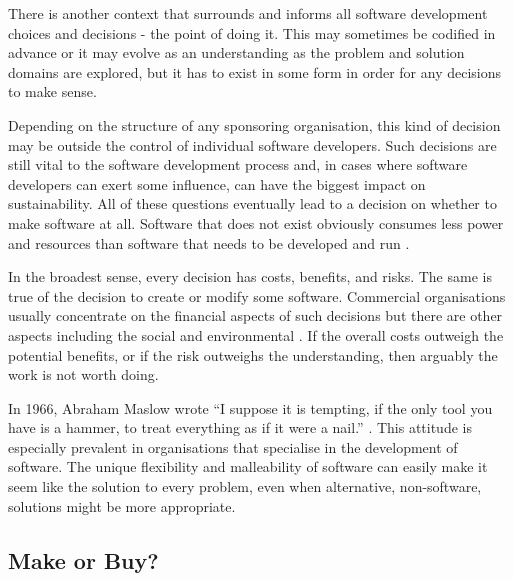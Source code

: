 There is another context that surrounds and informs all software development choices and decisions - the point of doing it. This may sometimes be codified in advance or it may evolve as an understanding as the problem and solution domains are explored, but it has to exist in some form in order for any decisions to make sense.

Depending on the structure of any sponsoring organisation, this kind of decision may be outside the control of individual software developers. Such decisions are still vital to the software development process and, in cases where software developers can exert some influence, can have the biggest impact on sustainability. All of these questions eventually lead to a decision on whether to make software at all. Software that does not exist obviously consumes less power and resources than software that needs to be developed and run \citep{Linders2023}.

In the broadest sense, every decision has costs, benefits, and risks. The same is true of the decision to create or modify some software. Commercial organisations usually concentrate on the financial aspects of such decisions but there are other aspects including the social and environmental \citep{MoisesdeSouza2023} \citep{Barbier1990}. If the overall costs outweigh the potential benefits, or if the risk outweighs the understanding, then arguably the work is not worth doing.

In 1966, Abraham Maslow wrote \enquote{I suppose it is tempting, if the only tool you have is a hammer, to treat everything as if it were a nail.} \citep{Maslow1966}. This attitude is especially prevalent in organisations that specialise in the development of software. The unique flexibility and malleability of software can easily make it seem like the solution to every problem, even when alternative, non-software, solutions might be more appropriate.

\subsection{Make or Buy?}

